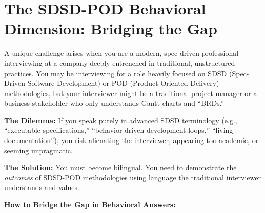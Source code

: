 \documentclass[
  11pt,
  openany,
  oneside]{book}
\begin{document}
\bigskip

\section{The SDSD-POD Behavioral Dimension: Bridging the
Gap}\label{the-sdsd-pod-behavioral-dimension-bridging-the-gap}

A unique challenge arises when you are a modern, spec-driven
professional interviewing at a company deeply entrenched in traditional,
unstructured practices. You may be interviewing for a role heavily
focused on SDSD (Spec-Driven Software Development) or POD
(Product-Oriented Delivery) methodologies, but your interviewer might be
a traditional project manager or a business stakeholder who only
understands Gantt charts and ``BRDs.''

\textbf{The Dilemma:} If you speak purely in advanced SDSD terminology
(e.g., ``executable specifications,'' ``behavior-driven development
loops,'' ``living documentation''), you risk alienating the interviewer,
appearing too academic, or seeming unpragmatic.

\textbf{The Solution:} You must become bilingual. You need to
demonstrate the \emph{outcomes} of SDSD-POD methodologies using language
the traditional interviewer understands and values.

\textbf{How to Bridge the Gap in Behavioral Answers:}
\end{document}
